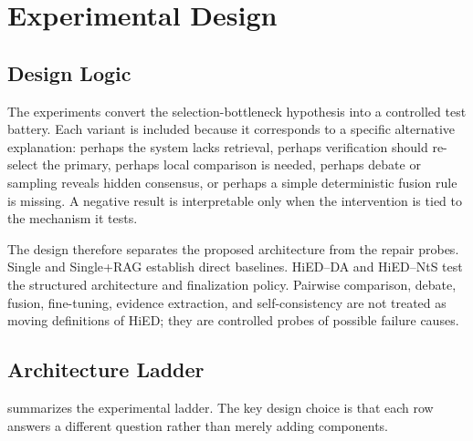 \chapter{Experimental Design}
\label{ch:experimental}

\section{Design Logic}

The experiments convert the selection-bottleneck hypothesis into a controlled test battery. Each variant is included because it corresponds to a specific alternative explanation: perhaps the system lacks retrieval, perhaps verification should re-select the primary, perhaps local comparison is needed, perhaps debate or sampling reveals hidden consensus, or perhaps a simple deterministic fusion rule is missing. A negative result is interpretable only when the intervention is tied to the mechanism it tests.

The design therefore separates the proposed architecture from the repair probes. Single and Single+RAG establish direct baselines. HiED--DA and HiED--NtS test the structured architecture and finalization policy. Pairwise comparison, debate, fusion, fine-tuning, evidence extraction, and self-consistency are not treated as moving definitions of HiED; they are controlled probes of possible failure causes.

\section{Architecture Ladder}

 summarizes the experimental ladder. The key design choice is that each row answers a different question rather than merely adding components.

